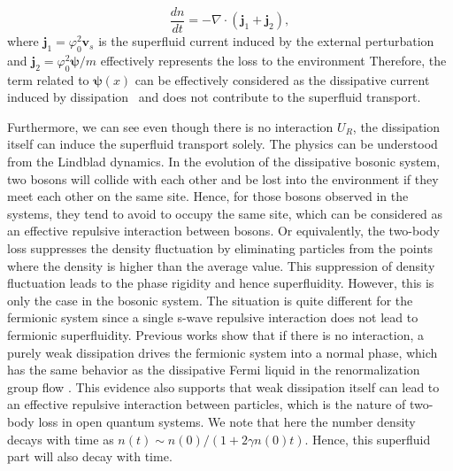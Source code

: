 \documentclass[aps,prl,twocolumn,superscriptaddress,]{revtex4-1}
\begin{document}
\begin{equation}
\frac{dn}{dt}=-\nabla\cdot(\bm{j}_{1}+\bm{j}_{2}),
\end{equation}
where $\bm{j}_{1}=\varphi_{0}^{2}\bm{v}_{s}$ is the superfluid current induced by the external perturbation
and $\bm{j}_{2}=\varphi_{0}^{2}\bm{\psi}/m$ effectively represents the loss to the environment
Therefore, the term related to $\bm{\psi}(x)$ can be effectively considered as the dissipative
current induced by dissipation~\citep{PhysRevLett.93.160404} and does not contribute to the superfluid transport.

Furthermore, we can see even though there is no interaction $U_{R}$, the dissipation itself can induce the superfluid transport solely. The physics can be understood from the Lindblad dynamics. In the evolution of the dissipative bosonic system, two bosons will collide with each other and be lost into the environment if they meet each other on the same site. Hence, for those bosons observed in the systems, they tend to avoid to occupy the same site, which can be considered as an effective repulsive interaction between bosons. %
Or equivalently, the two-body loss suppresses the density fluctuation by eliminating particles from the points where the density is higher than the average value. This suppression of density fluctuation leads to the phase rigidity and hence superfluidity.  However, this is only the case in the bosonic system. The situation is quite different for the fermionic system since a single s-wave repulsive interaction does not lead to fermionic superfluidity. Previous works show that if there is no interaction, a purely weak dissipation drives the fermionic system into a normal phase, which has the same behavior as the dissipative Fermi liquid in the renormalization group flow \citep{Yamamoto2019,Hongchao2023}. This evidence also supports that weak dissipation itself can lead to an effective repulsive interaction between particles, which is the nature of two-body loss in open quantum systems. We note that here the number density decays with time as $n(t)\sim n(0)/(1+2\gamma n(0)t)$. Hence, this superfluid part will also decay with time.
\end{document}
